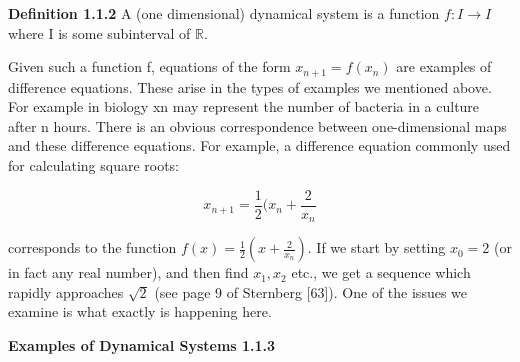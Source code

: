 \documentclass[12pt]{article}
\begin{document}
\hfill

\textbf{Definition 1.1.2} A (one dimensional) dynamical system is a function $f: I \to I$
where I is some subinterval of $\mathbb{R}$.

\hfill

Given such a function f, equations of the form $x_{n+1} = f(x_n)$ are examples of
difference equations. These arise in the types of examples we mentioned above. For example in biology xn may represent the number of bacteria in a culture after n hours.
There is an obvious correspondence between one-dimensional maps and these difference
equations. For example, a difference equation commonly used for calculating
square roots:

\[
x_{n+1} = \frac{1}{2}(x_n + \frac{2}{x_n}
\]
 
corresponds to the function $f(x) = \frac{1}{2} (x + \frac{2}{x_n})$. If we start by setting $x_0 = 2$ (or in
fact any real number), and then find $x_1, x_2$ etc., we get a sequence which rapidly
approaches $\sqrt{2}$ (see page 9 of Sternberg [63]). One of the issues we examine is what
exactly is happening here.

\hfill

\textbf{Examples of Dynamical Systems 1.1.3}

\hfill
\end{document}
